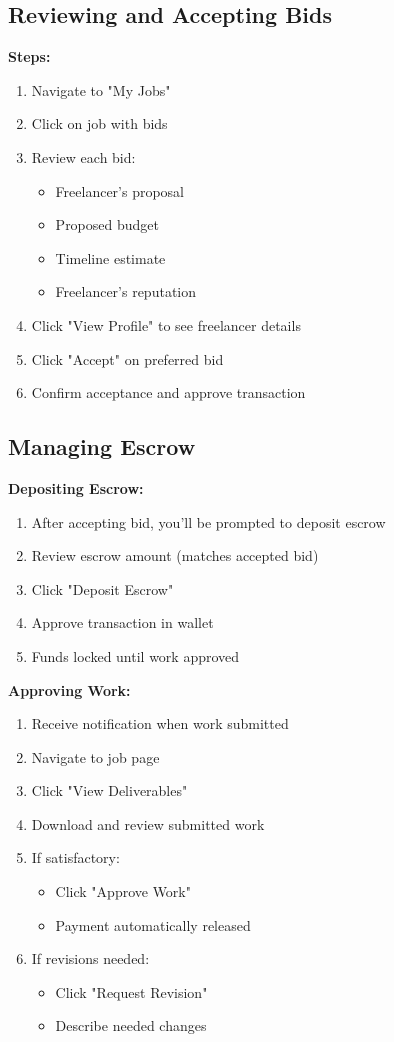 \documentclass[a4paper,13pt,twoside]{report}
\theoremstyle{definition}
\begin{document}
\subsection{Reviewing and Accepting Bids}

\textbf{Steps:}
\begin{enumerate}
    \item Navigate to "My Jobs"
    \item Click on job with bids
    \item Review each bid:
    \begin{itemize}
        \item Freelancer's proposal
        \item Proposed budget
        \item Timeline estimate
        \item Freelancer's reputation
    \end{itemize}
    \item Click "View Profile" to see freelancer details
    \item Click "Accept" on preferred bid
    \item Confirm acceptance and approve transaction
\end{enumerate}

\subsection{Managing Escrow}

\textbf{Depositing Escrow:}
\begin{enumerate}
    \item After accepting bid, you'll be prompted to deposit escrow
    \item Review escrow amount (matches accepted bid)
    \item Click "Deposit Escrow"
    \item Approve transaction in wallet
    \item Funds locked until work approved
\end{enumerate}

\textbf{Approving Work:}
\begin{enumerate}
    \item Receive notification when work submitted
    \item Navigate to job page
    \item Click "View Deliverables"
    \item Download and review submitted work
    \item If satisfactory:
    \begin{itemize}
        \item Click "Approve Work"
        \item Payment automatically released
    \end{itemize}
    \item If revisions needed:
    \begin{itemize}
        \item Click "Request Revision"
        \item Describe needed changes
    \end{itemize}
\end{enumerate}
\end{document}

